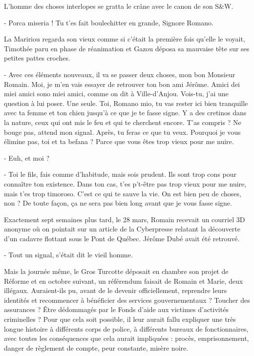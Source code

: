 L’homme des choses interlopes se gratta le crâne avec le canon de son S\&W.

- Porca miseria ! Tu t’es fait boulechitter en grande, Signore Romano.

La Maririou regarda son vieux comme si c’était la première fois qu’elle le voyait, Timothée paru en phase de réanimation et Gazou déposa sa mauvaise tête sur ses petites pattes croches.

- Avec ces éléments nouveaux, il va se passer deux choses, mon bon Monsieur Romain. Moi, je m’en vais essayer de retrouver ton bon ami Jérôme. Amici dei miei amici sono miei amici, comme on dit à Ville-d’Anjou. Vois-tu, j’ai une question à lui poser. Une seule. Toi, Romano mio, tu vas rester ici bien tranquille avec ta femme et ton chien jusqu’à ce que je te fasse signe. Y a des cretinos dans la nature, ceux qui ont mis le feu et qui te cherchent encore. T’as compris ? Ne bouge pas, attend mon signal. Après, tu feras ce que tu veux. Pourquoi je vous élimine pas, toi et ta befana ? Parce que vous êtes trop vieux pour me nuire.

- Euh, et moi ?

- Toi le fils, fais comme d’habitude, mais sois prudent. Ils sont trop cons pour connaître ton existence. Dans ton cas, t’es p’t-être pas trop vieux pour me nuire, mais t’es trop timoroso. C’est ce qui te sauve la vie. On est bien peu de choses, non ? De toute façon, ça ne sera pas bien long avant que je vous fasse signe.

Exactement sept semaines plus tard, le 28 mars, Romain recevait un courriel 3D anonyme où on pointait sur un article de la Cyberpresse relatant la découverte d’un cadavre flottant sous le Pont de Québec. Jérôme Dubé avait été retrouvé.

- Tout un signal, s’était dit le vieil homme.

Mais la journée même, le Gros Turcotte déposait en chambre son projet de Réforme et en octobre suivant, un référendum faisait de Romain et Marie, deux illégaux. Auraient-ils pu, avant de le devenir officiellement, reprendre leurs identités et recommencer à bénéficier des services gouvernementaux ? Toucher des assurances ? Être dédommagés par le Fonds d’aide aux victimes d’activités criminelles ? Pour que cela soit possible, il leur aurait fallu expliquer une très longue histoire à différents corps de police, à différents bureaux de fonctionnaires, avec toutes les conséquences que cela aurait impliquées : procès, emprisonnement, danger de règlement de compte, peur constante, misère noire.

